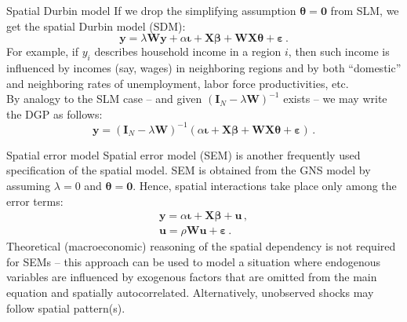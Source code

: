 \documentclass{beamer}
\begin{document}
\begin{frame}{Spatial Durbin model}
If we drop the simplifying assumption $\bm{\theta}=\bm{0}$ from SLM, we get the spatial Durbin model (SDM):
\begin{equation*} 
  \bm{y} = \lambda \bm{W\!y} + \alpha \bm{\iota} + \bm{X \beta} + \bm{W\!X\theta} + \bm{\varepsilon}\,.
\end{equation*}
For example, if $y_i$ describes household income in a region $i$, then such income is influenced by incomes (say, wages) in neighboring regions and by both ``domestic'' and neighboring rates of unemployment, labor force productivities, etc.  
\\ \medskip
By analogy to the SLM case -- and  given $(\bm{I}_{N} - \lambda \bm{W})^{-1}$ exists -- we may write the DGP as follows:
\begin{equation*}
\bm{y} = (\bm{I}_{N} - \lambda \bm{W})^{-1} (\alpha \bm{\iota} + \bm{X \beta} + \bm{W\!X\theta}+ \bm{\varepsilon})\,.
\end{equation*}
\end{frame}
\begin{frame}{Spatial error model}
Spatial error model (SEM) is another frequently used specification of the spatial model. SEM is obtained from the GNS model by assuming $\lambda=0$ and $\bm{\theta}=\bm{0}$. Hence, spatial interactions take place only among the error terms: 
\begin{equation*}
\begin{aligned}
\bm{y} = \alpha \bm{\iota} + \bm{X \beta} + \bm{u}\,, \\
 \bm{u} = \rho \bm{W\!u} + \bm{\varepsilon}\,.
\end{aligned}
\end{equation*}
Theoretical (macroeconomic) reasoning of the spatial dependency is not required for SEMs -- this approach can be used to model a situation where endogenous variables are influenced by exogenous factors that are omitted from the main equation and spatially autocorrelated. Alternatively, unobserved shocks may follow spatial pattern(s).
\end{frame}
\end{document}
